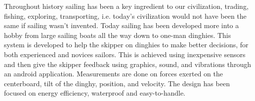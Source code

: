Throughout history sailing has been a key ingredient to our civilization, trading, fishing, exploring, transporting, i.e. today's civilization would not have been the same if sailing wasn't invented. Today sailing has been developed more into a hobby from large sailing boats all the way down to one-man dinghies. 
This system is developed to help the skipper on dinghies to make better decisions, for both experienced and novices sailors. This is achieved using inexpensive sensors and then give the skipper feedback using graphics, sound, and vibrations through an android application. Measurements are done on forces exerted on the centerboard, tilt of the dinghy, position, and velocity. The design has been focused on energy efficiency, waterproof and easy-to-handle.
